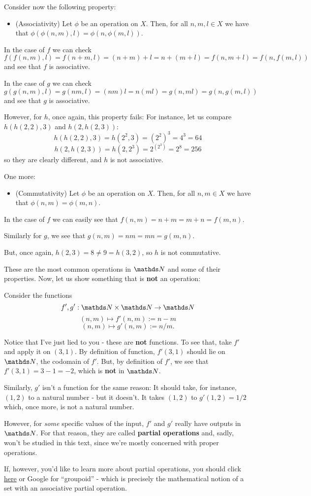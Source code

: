 \begin{ex}
	\bigskip
	Consider now the following property:
	\begin{itemize}
		\item (Associativity) Let $\phi$ be an operation on $X$. Then, for all $n,m,l\in X$ we have that $\phi(\phi(n,m),l)=\phi(n,\phi(m,l))$.
	\end{itemize}

	In the case of $f$ we can check
	\[f(f(n,m),l)=f(n+m,l)=(n+m)+l=n+(m+l)=f(n,m+l)=f(n,f(m,l))\]and see that $f$ is associative.
	
	In the case of $g$ we can check
	\[g(g(n,m),l)=g(nm,l)=(nm)l=n(ml)=g(n,ml)=g(n,g(m,l))\]and see that $g$ is associative.
	
	However, for $h$, once again, this property fails: For instance, let us compare $h(h(2,2),3)$ and $h(2,h(2,3))$:
	\[h(h(2,2),3)=h(2^2,3)=(2^2)^3=4^3=64\]
	\[h(2,h(2,3))=h(2,2^3)=2^{(2^3)}=2^8=256\]so they are clearly different, and $h$ is not associative.
	
	\bigskip
	One more:
	\begin{itemize}
		\item (Commutativity) Let $\phi$ be an operation on $X$. Then, for all $n,m\in X$ we have that $\phi(n,m)=\phi(m,n)$.
	\end{itemize}

	In the case of $f$ we can easily see that $f(n,m)=n+m=m+n=f(m,n)$.
	
	Similarly for $g$, we see that $g(n,m)=nm=mn=g(m,n)$.
	
	But, once again, $h(2,3)=8\neq 9=h(3,2)$, so $h$ is not commutative.
	
	\bigskip
	These are the most common operations in $\N$ and some of their properties. Now, let us show something that is \textbf{not} an operation:
	
	Consider the functions $$f',g':\N\times\N\to\N$$\[(n,m)\mapsto f'(n,m):=n-m\]
	\[(n,m)\mapsto g'(n,m):=n/m.\]
	
	Notice that I've just lied to you - these are \textbf{not} functions. To see that, take $f'$ and apply it on $(3,1)$. By definition of function, $f'(3,1)$ should lie on $\N$, the codomain of $f'$. But, by definition of $f'$, we see that $f'(3,1)=3-1=-2$, which is \textbf{not} in $\N$.
	
	Similarly, $g'$ isn't a function for the same reason: It should take, for instance, $(1,2)$ to a natural number - but it doesn't. It takes $(1,2)$ to $g'(1,2)=1/2$ which, once more, is not a natural number.
	
	However, for \textit{some} specific values of the input, $f'$ and $g'$ really have outputs in $\N$. For that reason, they are called \textbf{partial operations} and, sadly, won't be studied in this text, since we're mostly concerned with proper operations.
	
	If, however, you'd like to learn more about partial operations, you should click \href{https://ncatlab.org/nlab/show/groupoid}{here} or Google for ``groupoid'' - which is precisely the mathematical notion of a set with an associative partial operation.
\end{ex}

